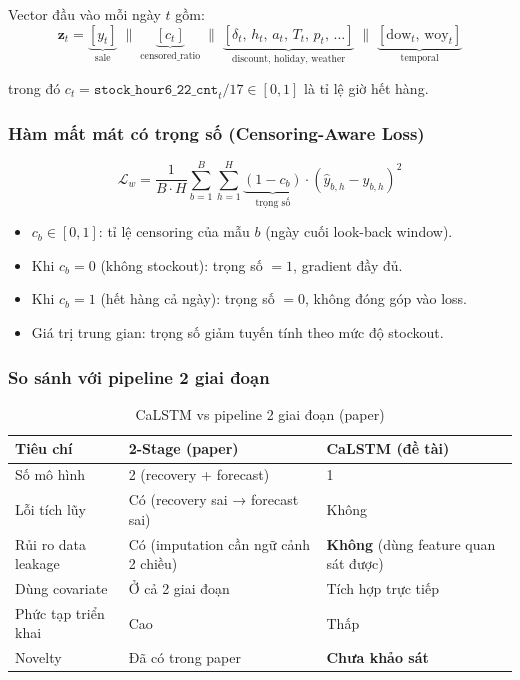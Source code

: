 \documentclass[12pt,a4paper]{report}
\begin{document}
Vector đầu vào mỗi ngày $t$ gồm:
\[
\mathbf{z}_t = \underbrace{[y_t]}_{\text{sale}}
\;\|\;
\underbrace{[c_t]}_{\text{censored\_ratio}}
\;\|\;
\underbrace{[\delta_t,\, h_t,\, a_t,\, T_t,\, p_t,\, \ldots]}_{\text{discount, holiday, weather}}
\;\|\;
\underbrace{[\text{dow}_t,\, \text{woy}_t]}_{\text{temporal}}
\]

trong đó $c_t = \texttt{stock\_hour6\_22\_cnt}_t / 17 \in [0, 1]$ là tỉ lệ giờ hết hàng.

\subsubsection*{Hàm mất mát có trọng số (Censoring-Aware Loss)}

\[
\mathcal{L}_w = \frac{1}{B \cdot H} \sum_{b=1}^{B} \sum_{h=1}^{H}
\underbrace{(1 - c_b)}_{\text{trọng số}} \cdot \left(\hat{y}_{b,h} - y_{b,h}\right)^2
\]

\begin{itemize}
    \item $c_b \in [0,1]$: tỉ lệ censoring của mẫu $b$ (ngày cuối look-back window).
    \item Khi $c_b = 0$ (không stockout): trọng số $= 1$, gradient đầy đủ.
    \item Khi $c_b = 1$ (hết hàng cả ngày): trọng số $= 0$, không đóng góp vào loss.
    \item Giá trị trung gian: trọng số giảm tuyến tính theo mức độ stockout.
\end{itemize}

\subsubsection*{So sánh với pipeline 2 giai đoạn}

\begin{table}[H]
\centering
\caption{CaLSTM vs pipeline 2 giai đoạn (paper)}
\begin{tabular}{lll}
\toprule
\textbf{Tiêu chí} & \textbf{2-Stage (paper)} & \textbf{CaLSTM (đề tài)} \\
\midrule
Số mô hình        & 2 (recovery + forecast) & 1 \\
Lỗi tích lũy      & Có (recovery sai → forecast sai) & Không \\
Rủi ro data leakage & Có (imputation cần ngữ cảnh 2 chiều) & \textbf{Không} (dùng feature quan sát được) \\
Dùng covariate    & Ở cả 2 giai đoạn        & Tích hợp trực tiếp \\
Phức tạp triển khai & Cao                   & Thấp \\
Novelty           & Đã có trong paper        & \textbf{Chưa khảo sát} \\
\bottomrule
\end{tabular}
\end{table}
\end{document}
